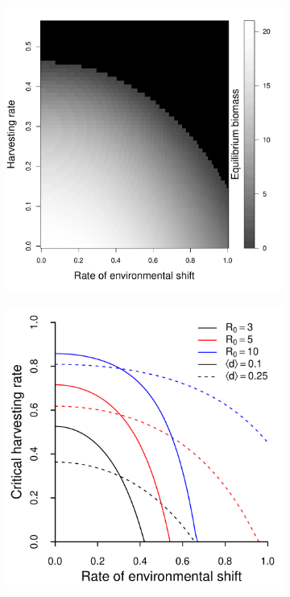 \documentclass[12pt,english]{article}
\begin{document}
\begin{spacing}{1.9}
\begin{flushleft}
\begin{figure}[htbp]
\begin{subfigure}{3in}
\subcaption{\label{biomass}}
\includegraphics[width=\textwidth]{plots/eqbiomass.pdf}
\end{subfigure}
\begin{subfigure}{3in}
\subcaption{\label{rates}}
\includegraphics[width=\textwidth]{plots/critical_rates.pdf}

\end{subfigure}
\end{figure}
\end{flushleft}
\end{spacing}
\end{document}
